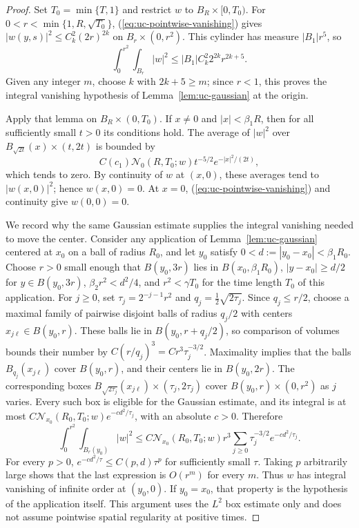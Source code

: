 \documentclass[11pt,letterpaper]{article}
\numberwithin{equation}{section}
\theoremstyle{plain}
\theoremstyle{definition}
\theoremstyle{remark}
\begin{document}
\begin{proof}
Set $T_0=\min\{T,1\}$ and restrict $w$ to $B_R\times[0,T_0)$. For
$0<r<\min\{1,R,\sqrt{T_0}\}$, (\ref{eq:uc-pointwise-vanishing}) gives
$|w(y,s)|^2\leq C_k^2(2r)^{2k}$ on
$B_r\times(0,r^2)$. This cylinder has measure $|B_1|r^5$, so
\[
 \int_0^{r^2}\int_{B_r}|w|^2\leq |B_1|C_k^2 2^{2k}r^{2k+5}.
\]
Given any integer $m$, choose $k$ with $2k+5\geq m$; since $r<1$, this
proves the integral vanishing hypothesis of Lemma~\ref{lem:uc-gaussian} at
the origin.

Apply that lemma on $B_R\times(0,T_0)$. If $x\ne0$ and $|x|<\beta_1R$,
then for all sufficiently small $t>0$ its conditions hold. The average of
$|w|^2$ over $B_{\sqrt{2t}}(x)\times(t,2t)$ is bounded by
\[
 C(c_1)\mathcal N_0(R,T_0;w)t^{-5/2}
       e^{-|x|^2/(2t)},
\]
which tends to zero. By continuity of $w$ at $(x,0)$, these averages tend to
$|w(x,0)|^2$; hence $w(x,0)=0$. At $x=0$, (\ref{eq:uc-pointwise-vanishing})
and continuity give $w(0,0)=0$.

We record why the same Gaussian estimate supplies the integral vanishing
needed to move the center. Consider any application of
Lemma~\ref{lem:uc-gaussian} centered at $x_0$ on a ball of radius $R_0$,
and let $y_0$ satisfy $0<d:=|y_0-x_0|<\beta_1R_0$. Choose $r>0$ small
enough that $B(y_0,3r)$ lies in $B(x_0,\beta_1R_0)$,
$|y-x_0|\geq d/2$ for $y\in B(y_0,3r)$,
$\beta_2r^2<d^2/4$, and $r^2<\gamma T_0$ for the time length $T_0$ of
this application. For $j\geq0$, set $\tau_j=2^{-j-1}r^2$ and
$q_j=\tfrac12\sqrt{2\tau_j}$. Since $q_j\leq r/2$, choose a maximal family
of pairwise disjoint balls of radius $q_j/2$ with centers
$x_{j\ell}\in B(y_0,r)$. These balls lie in $B(y_0,r+q_j/2)$, so comparison
of volumes bounds their number by
$C(r/q_j)^3=C r^3\tau_j^{-3/2}$. Maximality implies that the balls
$B_{q_j}(x_{j\ell})$ cover $B(y_0,r)$, and their centers lie in
$B(y_0,2r)$.
The corresponding boxes
$B_{\sqrt{2\tau_j}}(x_{j\ell})\times(\tau_j,2\tau_j)$ cover
$B(y_0,r)\times(0,r^2)$ as $j$ varies. Every such box is eligible for
the Gaussian estimate, and its integral is at most
$C\mathcal N_{x_0}(R_0,T_0;w)e^{-c d^2/\tau_j}$, with an absolute $c>0$.
Therefore
\[
 \int_0^{r^2}\int_{B_r(y_0)}|w|^2
 \leq C\mathcal N_{x_0}(R_0,T_0;w)r^3
       \sum_{j\geq0}\tau_j^{-3/2}e^{-c d^2/\tau_j}.
\]
For every $p>0$, $e^{-cd^2/\tau}\leq C(p,d)\tau^p$ for sufficiently
small $\tau$. Taking $p$ arbitrarily large shows that the last expression
is $O(r^m)$ for every $m$. Thus $w$ has integral vanishing of infinite
order at $(y_0,0)$. If $y_0=x_0$, that property is the hypothesis of the
application itself. This argument uses the $L^2$ box estimate only and
does not assume pointwise spatial regularity at positive times.


\end{proof}
\end{document}
